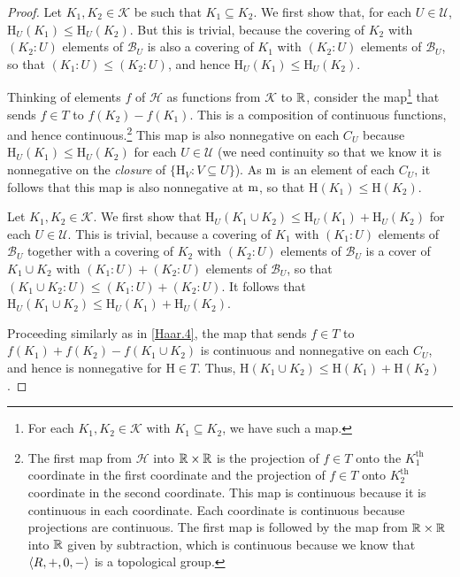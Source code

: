 \begin{thm}
\begin{savenotes}
\begin{proof}
\label{Haar.4}
Let $K_1,K_2\in \mathcal{K}$ be such that $K_1\subseteq K_2$.  We first show that, for each $U\in \mathcal{U}$, $\mathrm{H}_U(K_1)\leq \mathrm{H}_U(K_2)$.  But this is trivial, because the covering of $K_2$ with $(K_2:U)$ elements of $\mathcal{B}_U$ is also a covering of $K_1$ with $(K_2:U)$ elements of $\mathcal{B}_U$, so that $(K_1:U)\leq (K_2:U)$, and hence $\mathrm{H}_U(K_1)\leq \mathrm{H}_U(K_2)$.

Thinking of elements $f$ of $\mathcal{H}$ as functions from $\mathcal{K}$ to $\mathbb{R}$, consider the map\footnote{For each $K_1,K_2\in \mathcal{K}$ with $K_1\subseteq K_2$, we have such a map.} that sends $f\in T$ to $f(K_2)-f(K_1)$.  This is a composition of continuous functions, and hence continuous.\footnote{The first map from $\mathcal{H}$ into $\mathbb{R} \times \mathbb{R}$ is the projection of $f\in T$ onto the $K_1^{\text{th}}$ coordinate in the first coordinate and the projection of $f\in T$ onto $K_2^{\text{th}}$ coordinate in the second coordinate.  This map is continuous because it is continuous in each coordinate.  Each coordinate is continuous because projections are continuous.  The first map is followed by the map from $\mathbb{R} \times \mathbb{R}$ into $\mathbb{R}$ given by subtraction, which is continuous because we know that $\langle R,+,0,-\rangle$ is a topological group.}  This map is also nonnegative on each $C_U$ because $\mathrm{H}_U(K_1)\leq \mathrm{H}_U(K_2)$ for each $U\in \mathcal{U}$ (we need continuity so that we know it is nonnegative on the \emph{closure} of $\{ \mathrm{H}_V:V\subseteq U\}$).  As $\mathrm{m}$ is an element of each $C_U$, it follows that this map is also nonnegative at $\mathrm{m}$, so that $\mathrm{H}(K_1)\leq \mathrm{H}(K_2)$.

\label{Haar.5}
Let $K_1,K_2\in \mathcal{K}$.  We first show that $\mathrm{H}_U(K_1\cup K_2)\leq \mathrm{H}_U(K_1)+\mathrm{H}_U(K_2)$ for each $U\in \mathcal{U}$.  This is trivial, because a covering of $K_1$ with $(K_1:U)$ elements of $\mathcal{B}_U$ together with a covering of $K_2$ with $(K_2:U)$ elements of $\mathcal{B}_U$ is a cover of $K_1\cup K_2$ with $(K_1:U)+(K_2:U)$ elements of $\mathcal{B}_U$, so that $(K_1\cup K_2:U)\leq (K_1:U)+(K_2:U)$.  It follows that $\mathrm{H}_U(K_1\cup K_2)\leq \mathrm{H}_U(K_1)+\mathrm{H}_U(K_2)$.

Proceeding similarly as in \cref{Haar.4}, the map that sends $f\in T$ to $f(K_1)+f(K_2)-f(K_1\cup K_2)$ is continuous and nonnegative on each $C_U$, and hence is nonnegative for $\mathrm{H}\in T$.  Thus, $\mathrm{H}(K_1\cup K_2)\leq \mathrm{H}(K_1)+\mathrm{H}(K_2)$.


\end{proof}
\end{savenotes}
\end{thm}

